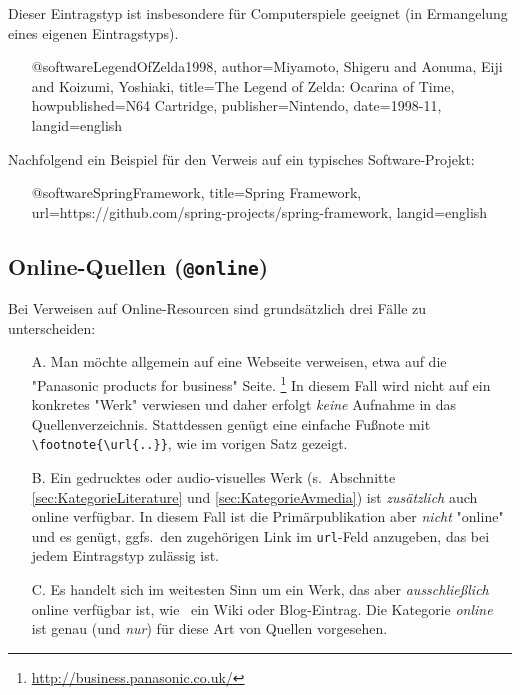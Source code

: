 Dieser Eintragstyp ist insbesondere für Computerspiele geeignet (in
Ermangelung eines eigenen Eintragstyps).
%
\begin{itemize}
\item[]
\begin{GenericCode}[numbers=none]
@software{LegendOfZelda1998,
  author={Miyamoto, Shigeru and Aonuma, Eiji and Koizumi, Yoshiaki},
  title={The Legend of Zelda: Ocarina of Time},
  howpublished={N64 Cartridge},
  publisher={Nintendo},
  date={1998-11},
  langid={english}
}
\end{GenericCode}
\item[\cite{LegendOfZelda1998}] 
\end{itemize}

\noindent
Nachfolgend ein Beispiel für den Verweis auf ein typisches Software-Projekt:
%
\begin{itemize}
\item[]
\begin{GenericCode}[numbers=none]
@software{SpringFramework,
  title={Spring Framework},
  url={https://github.com/spring-projects/spring-framework},
  langid={english}
}
\end{GenericCode}
\item[\cite{SpringFramework}] 
\end{itemize}



\subsection{Online-Quellen (\texttt{\bfseries @online})}
\label{sec:KategorieOnline}

Bei Verweisen auf Online-Resourcen sind grundsätzlich drei Fälle zu
unterscheiden:
%
\begin{itemize}
    \item[A.] Man möchte allgemein auf eine Webseite verweisen, etwa auf die
    "Panasonic products for business" Seite.%
    \footnote{\url{http://business.panasonic.co.uk/}}
    In diesem Fall wird nicht auf ein konkretes "Werk" verwiesen und daher
    erfolgt \emph{keine} Aufnahme in das Quellenverzeichnis. Stattdessen genügt
    eine einfache Fußnote mit \verb!\footnote{\url{..}}!, wie im vorigen Satz
    gezeigt.
%
    \item[B.] Ein gedrucktes oder audio-visuelles Werk (s.\ Abschnitte
    \ref{sec:KategorieLiterature} und \ref{sec:KategorieAvmedia}) ist
    \emph{zusätzlich} auch online verfügbar. In diesem Fall ist die
    Primär\-publikation aber \emph{nicht} "online" und es genügt, ggfs.\ den
    zugehörigen Link im \texttt{url}-Feld anzugeben, das bei jedem Eintragstyp
    zulässig ist.
%
    \item[C.] Es handelt sich im weitesten Sinn um ein Werk, das aber
    \emph{ausschließlich} online verfügbar ist, wie \zB\ ein Wiki oder
    Blog-Eintrag. Die Kategorie \emph{online} ist genau (und \emph{nur}) für
    diese Art von Quellen vorgesehen.
\end{itemize}


